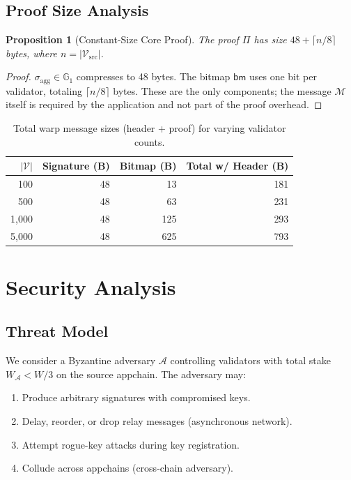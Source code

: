 \documentclass[11pt,a4paper]{article}
\newtheorem{proposition}[theorem]{Proposition}
\begin{document}
\subsection{Proof Size Analysis}

\begin{proposition}[Constant-Size Core Proof]\label{prop:proofsize}
The proof $\Pi$ has size $48 + \lceil n/8 \rceil$ bytes, where $n = |\mathcal{V}_{\text{src}}|$.
\end{proposition}

\begin{proof}
$\sigma_{\text{agg}} \in \mathbb{G}_1$ compresses to 48 bytes. The bitmap $\mathsf{bm}$ uses one bit per validator, totaling $\lceil n/8 \rceil$ bytes. These are the only components; the message $\mathcal{M}$ itself is required by the application and not part of the proof overhead.
\end{proof}

\begin{table}[H]
\centering
\caption{Total warp message sizes (header + proof) for varying validator counts.}
\label{tab:proofsize}
\begin{tabular}{rrrr}
\toprule
\textbf{$|\mathcal{V}|$} & \textbf{Signature (B)} & \textbf{Bitmap (B)} & \textbf{Total w/ Header (B)} \\
\midrule
100 & 48 & 13 & 181 \\
500 & 48 & 63 & 231 \\
1{,}000 & 48 & 125 & 293 \\
5{,}000 & 48 & 625 & 793 \\
\bottomrule
\end{tabular}
\end{table}

\section{Security Analysis}\label{sec:security}

\subsection{Threat Model}

We consider a Byzantine adversary $\mathcal{A}$ controlling validators with total stake $W_{\mathcal{A}} < W/3$ on the source appchain. The adversary may:
\begin{enumerate}
    \item Produce arbitrary signatures with compromised keys.
    \item Delay, reorder, or drop relay messages (asynchronous network).
    \item Attempt rogue-key attacks during key registration.
    \item Collude across appchains (cross-chain adversary).
\end{enumerate}
\end{document}
